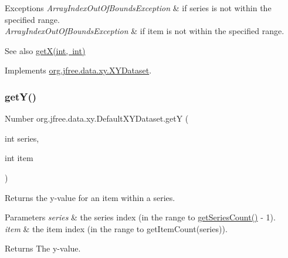 \begin{DoxyExceptions}{Exceptions}
{\em Array\+Index\+Out\+Of\+Bounds\+Exception} & if {\ttfamily series} is not within the specified range. \\
\hline
{\em Array\+Index\+Out\+Of\+Bounds\+Exception} & if {\ttfamily item} is not within the specified range.\\
\hline
\end{DoxyExceptions}
\begin{DoxySeeAlso}{See also}
\mbox{\hyperlink{classorg_1_1jfree_1_1data_1_1xy_1_1_default_x_y_dataset_ab501c39779d3289533248c8c40a18c1d}{get\+X(int, int)}} 
\end{DoxySeeAlso}


Implements \mbox{\hyperlink{interfaceorg_1_1jfree_1_1data_1_1xy_1_1_x_y_dataset_a65bd212539d8f7dfb3d3d36b5f42e083}{org.\+jfree.\+data.\+xy.\+X\+Y\+Dataset}}.

\mbox{\label{classorg_1_1jfree_1_1data_1_1xy_1_1_default_x_y_dataset_a8ad15161967d0f527b5fa885ebc14bc6}} 
\subsubsection{\texorpdfstring{get\+Y()}{getY()}}
{\footnotesize\ttfamily Number org.\+jfree.\+data.\+xy.\+Default\+X\+Y\+Dataset.\+getY (\begin{DoxyParamCaption}\item[{int}]{series,  }\item[{int}]{item }\end{DoxyParamCaption})}

Returns the y-\/value for an item within a series.


\begin{DoxyParams}{Parameters}
{\em series} & the series index (in the range {} to {\ttfamily \mbox{\hyperlink{classorg_1_1jfree_1_1data_1_1xy_1_1_default_x_y_dataset_a0e11a4936eb729adf611cb44013abc5b}{get\+Series\+Count()}} -\/ 1}). \\
\hline
{\em item} & the item index (in the range {} to {\ttfamily get\+Item\+Count(series)}).\\
\hline
\end{DoxyParams}
\begin{DoxyReturn}{Returns}
The y-\/value.
\end{DoxyReturn}

